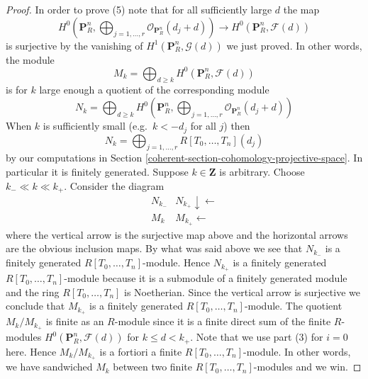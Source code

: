 \begin{proof}
\medskip\noindent
In order to prove (5) note that for all sufficiently large $d$
the map
$$
H^0(\mathbf{P}^n_R, \bigoplus\nolimits_{j = 1, \ldots, r}
\mathcal{O}_{\mathbf{P}^n_R}(d_j + d))
\to
H^0(\mathbf{P}^n_R, \mathcal{F}(d))
$$
is surjective by the vanishing of $H^1(\mathbf{P}^n_R, \mathcal{G}(d))$
we just proved. In other words, the module
$$
M_k
=
\bigoplus\nolimits_{d \geq k} H^0(\mathbf{P}^n_R, \mathcal{F}(d))
$$
is for $k$ large enough a quotient of the corresponding module
$$
N_k
=
\bigoplus\nolimits_{d \geq k} H^0(\mathbf{P}^n_R,
\bigoplus\nolimits_{j = 1, \ldots, r}
\mathcal{O}_{\mathbf{P}^n_R}(d_j + d)
)
$$
When $k$ is sufficiently small (e.g.\ $k < -d_j$ for all $j$) then
$$
N_k = \bigoplus\nolimits_{j = 1, \ldots, r}
R[T_0, \ldots, T_n](d_j)
$$
by our computations in Section \ref{coherent-section-cohomology-projective-space}.
In particular it is finitely generated.
Suppose $k \in \mathbf{Z}$ is arbitrary.
Choose $k_{-} \ll k \ll k_{+}$.
Consider the diagram
$$
\begin{array}{cc}N_{k_{-}} & N_{k_{+}} \downarrow\longleftarrow \\ M_k & M_{k_{+}} \longleftarrow\end{array}
$$
where the vertical arrow is the surjective map above and
the horizontal arrows are the obvious inclusion maps.
By what was said above we see that $N_{k_{-}}$ is a finitely
generated $R[T_0, \ldots, T_n]$-module. Hence $N_{k_{+}}$ is
a finitely generated $R[T_0, \ldots, T_n]$-module because it
is a submodule of a finitely generated module and the ring
$R[T_0, \ldots, T_n]$ is Noetherian. Since the vertical arrow
is surjective we conclude that $M_{k_{+}}$ is a finitely
generated $R[T_0, \ldots, T_n]$-module. The quotient
$M_k/M_{k_{+}}$ is finite as an $R$-module since it is a
finite direct sum of the finite $R$-modules
$H^0(\mathbf{P}^n_R, \mathcal{F}(d))$ for $k \leq d < k_{+}$.
Note that we use part (3) for $i = 0$ here. Hence
$M_k/M_{k_{+}}$ is a fortiori a finite $R[T_0, \ldots, T_n]$-module.
In other words, we have sandwiched $M_k$ between two finite
$R[T_0, \ldots, T_n]$-modules and we win.
\end{proof}

